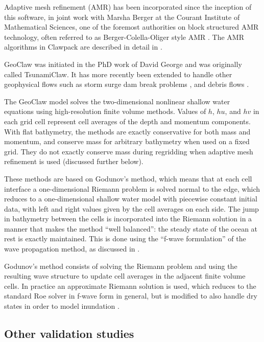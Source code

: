 \documentclass[11pt]{article}
\begin{document}
Adaptive mesh refinement (AMR) has been
incorporated since the inception of this software, 
in joint work with Marsha Berger at the
Courant Institute of Mathematical Sciences, one of the foremost authorities
on block structured AMR technology, often referred to as
Berger-Colella-Oliger style AMR \cite{berger-colella, berger-oliger}.  The
AMR algorithms in Clawpack are described in detail in
\cite{mjb-rjl:amrclaw}.  

GeoClaw was initiated in the PhD work of David George
\cite{dgeorge:phd,rjl-george:catalina04a,dg-rjl:tsunami06,George2008} and
was originally called TsunamiClaw.  It has more recently been extended to
handle other geophysical flows such as storm surge \cite{mandli:?}
dam break problems \cite{George:Malpasset}, and debris flows
\cite{GeorgeIverson2011}.

The GeoClaw model solves the two-dimensional nonlinear shallow water equations 
using high-resolution finite volume methods.  Values of $h$, $hu$, and $hv$
in each grid cell represent cell averages of the depth and momentum
components.  With flat bathymetry, the methods are exactly conservative for
both mass and momentum, and conserve mass for arbitrary bathymetry when used
on a fixed grid. They do not exactly conserve mass during regridding when
adaptive mesh refinement is used (discussed further below).

These methods are based on Godunov's method, which means that at each cell
interface a one-dimensional Riemann problem is solved normal to the edge,
which reduces to a one-dimensional shallow water model with piecewise
constant initial data,
with left and right values given by the cell averages on each side.
The jump in bathymetry between the cells is incorporated into the Riemann
solution in a manner that makes the method ``well balanced'': the steady
state of the ocean at rest is exactly maintained.  This is done using the
``f-wave formulation'' of the wave propagation method, as discussed in
\cite{BaleLeVequeEtAl2002,George2008,rjl:fvmhp,rjl:wbfwave10}.


Godunov's method consists of solving the Riemann problem and using the
resulting wave structure to update cell averages in the adjacent finite
volume cells.  In practice an approximate Riemann solution is used, which
reduces to the standard Roe solver \cite{rjl:fvmhp,roe:rs}
in f-wave form in general, but is modified
to also handle dry states in order to model inundation \cite{George2008}.

\subsection{Other validation studies}
\end{document}
